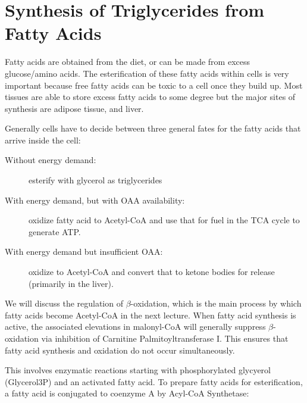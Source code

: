 \documentclass{tufte-handout}
\begin{document}
\section{Synthesis of Triglycerides from Fatty Acids}

Fatty acids are obtained from the diet, or can be made from excess glucose/amino acids.  The esterification of these fatty acids within cells is very important because free fatty acids can be toxic to a cell once they build up.  Most tissues are able to store excess fatty acids to some degree but the major sites of synthesis are adipose tissue, and liver.

Generally cells have to decide between three general fates for the fatty acids that arrive inside the cell:
\begin{description}
\item [Without energy demand:] esterify with glycerol as triglycerides
\item [With energy demand, but with OAA availability:] oxidize fatty acid to Acetyl-CoA and use that for fuel in the TCA cycle to generate ATP.
\item [With energy demand but insufficient OAA:] oxidize to Acetyl-CoA and convert that to ketone bodies for release (primarily in the liver).
\end{description}

We will discuss the regulation of $\beta$-oxidation, which is the main process by which fatty acids become Acetyl-CoA in the next lecture.  When fatty acid synthesis is active, the associated elevations in malonyl-CoA will generally suppress $\beta$-oxidation via inhibition of Carnitine Palmitoyltransferase I.  This ensures that fatty acid synthesis and oxidation do not occur simultaneously.

  This involves enzymatic reactions starting with phosphorylated glycyerol (Glycerol3P) and an activated fatty acid.  To prepare fatty acids for esterification, a fatty acid is conjugated to coenzyme A by Acyl-CoA Synthetase:
\end{document}
